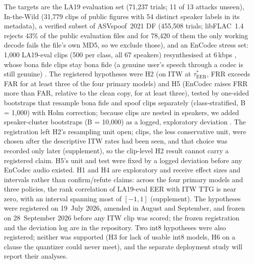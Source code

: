 \documentclass[review,authoryear]{elsarticle}
\newcommand{\tauE}{\tau^{*}_{\mathrm{EER}}}
\begin{document}
The targets \citep{wang20_asvspoof2019,muller22_in_the_wild,liu23_asvspoof2021} are the LA19 evaluation set (71,237 trials; 11 of 13 attacks unseen), In-the-Wild (31,779 clips of public
figures with 54 distinct speaker labels in its metadata), a verified subset of ASVspoof~2021 DF (455,508 trials; libFLAC~1.4
rejects 43\% of the public evaluation files and for 78,420 of them the only working decode fails the file's own MD5, so we
exclude those), and an EnCodec stress set: 1,000 LA19-eval clips (500 per class, all 67 speakers) resynthesised at 6\,kbps
\citep{defossez23_encodec}, whose bona fide clips stay bona fide (a genuine user's speech through a codec is still
genuine) \citep{wang25_asvspoof5_db,xiao26_resynth}. The registered hypotheses were H2 (on ITW at \(\tauE\), FRR exceeds FAR
for at least three of the four primary models) and H5 (EnCodec raises FRR more than FAR, relative to the clean copy, for
at least three), tested by one-sided bootstraps that resample bona fide and spoof clips separately (class-stratified,
B = 1,000) with Holm correction; because clips are nested
in speakers, we added speaker-cluster bootstraps (B = 10,000) as a logged, exploratory deviation \citep{bolle04_subsets,field07_boot}. The registration left H2's resampling unit open; clips, the less conservative unit, were chosen after the descriptive ITW rates had been seen, and that choice was recorded only later (supplement), so the clip-level H2 result cannot carry a registered claim. H5's unit and test were fixed by a logged deviation before any EnCodec audio existed. H1 and H4 are exploratory and receive effect sizes and intervals rather than confirm/refute claims: across the four primary models and three policies, the rank correlation of LA19-eval EER with ITW TTG is near zero, with an interval spanning most of \([-1,1]\) (supplement).
The hypotheses were registered on 19~July 2026, amended in August and September, and frozen on 28~September 2026 before any
ITW clip was scored; the frozen registration and the deviation log are in the repository. Two int8 hypotheses were also
registered; neither was supported (H3 for lack of usable int8 models, H6 on a clause the quantizer could never meet), and the separate deployment study will report their analyses.


\end{document}
